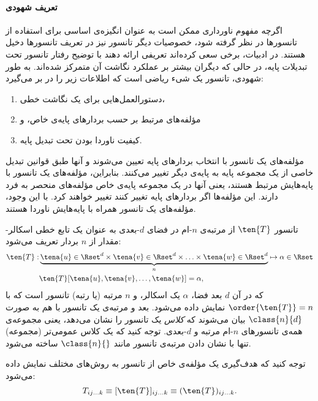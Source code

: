 \paragraph{تعریف شهودی} اگرچه مفهوم ناورداری ممکن است به عنوان انگیزه‌ی اساسی برای استفاده از تانسورها در نظر گرفته شود، خصوصیات دیگر تانسور نیز در تعریف تانسورها دخیل هستند. در ادبیات، برخی سعی کرده‌اند تعریفی ارائه دهند با توضیح رفتار تانسور تحت تبدیلات پایه، در حالی که دیگران بیشتر بر عملکرد نگاشت آن متمرکز شده‌اند. به طور شهودی، تانسور یک شیء ریاضی است که اطلاعات زیر را در بر می‌گیرد:

\begin{enumerate}
    \item دستورالعمل‌هایی برای یک نگاشت خطی،
    \item مؤلفه‌های مرتبط بر حسب بردارهای پایه‌ی خاص، و
    \item کیفیت ناوردا بودن تحت تبدیل پایه.
\end{enumerate}

مؤلفه‌های یک تانسور با انتخاب بردارهای پایه تعیین می‌شوند و آنها طبق قوانین تبدیل خاصی از یک مجموعه پایه به پایه‌ی دیگر تغییر می‌کنند. بنابراین، مؤلفه‌های یک تانسور با پایه‌هایش مرتبط هستند، یعنی آنها در یک مجموعه پایه‌ی خاص مؤلفه‌های منحصر به فرد دارند. این مؤلفه‌ها اگر بردارهای پایه تغییر کنند تغییر خواهند کرد. با این وجود، مؤلفه‌های یک تانسور همراه با پایه‌هایش ناوردا هستند.

\begin{definition}[تانسور]\label{def:tensors}
    تانسور $\ten{T}$ از مرتبه‌ی $n$-ام در فضای $d$-بعدی به عنوان یک تابع خطی اسکالر-مقدار از $n$ بردار تعریف می‌شود:
    \begin{equation}
        \begin{aligned}
            \ten{T}: & \underbrace{\tena{u}\in\Rset^d\times\tena{v}\in\Rset^d\times\ldots  \times\tena{w}\in\Rset^d}_n   \mapsto \alpha\in\Rset \\
                     & \ten{T}[\tena{u},\tena{v},\ldots,\tena{w}]=\alpha,
        \end{aligned}
    \end{equation}
    که در آن $d$ بعد فضا، $\alpha$ یک اسکالر، و $n$ مرتبه (یا رتبه) تانسور است که با $\order{\ten{T}}=n$ نمایش داده می‌شود. بعد و مرتبه‌ی یک تانسور با هم به صورت $\class{n}{d}$ بیان می‌شوند که \textit{کلاس} یک تانسور را نشان می‌دهد، یعنی مجموعه‌ی همه‌ی تانسورهای $n$-ام مرتبه و $d$-بعدی. توجه کنید که یک کلاس عمومی‌تر (مجموعه) تنها با نشان دادن مرتبه‌ی تانسور مانند $\class{n}{}$ ساخته می‌شود.

    توجه کنید که هدف‌گیری یک مؤلفه‌ی خاص از تانسور به روش‌های مختلف نمایش داده می‌شود:
    \begin{equation}
        T_{ij\ldots k}\equiv[\ten{T}]_{ij\ldots k}\equiv (\ten{T})_{ij\ldots k}.
    \end{equation}
\end{definition}

